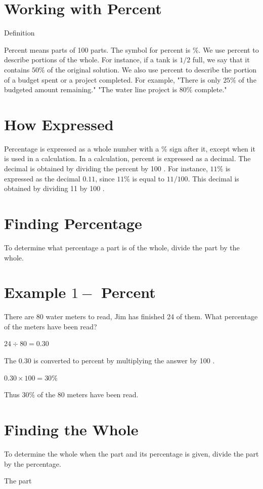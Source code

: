 \documentclass[10pt]{article}
\begin{document}
\section{Working with Percent}
Definition

Percent means parts of 100 parts. The symbol for percent is $\%$. We use percent to describe portions of the whole. For instance, if a tank is $1 / 2$ full, we say that it contains $50 \%$ of the original solution. We also use percent to describe the portion of a budget spent or a project completed. For example, "There is only $25 \%$ of the budgeted amount remaining." "The water line project is $80 \%$ complete."

\section{How Expressed}
Percentage is expressed as a whole number with a \% sign after it, except when it is used in a calculation. In a calculation, percent is expressed as a decimal. The decimal is obtained by dividing the percent by 100 . For instance, $11 \%$ is expressed as the decimal $0.11$, since $11 \%$ is equal to $11 / 100$. This decimal is obtained by dividing 11 by 100 .

\section{Finding Percentage}
To determine what percentage a part is of the whole, divide the part by the whole.

\section{Example $1-$ Percent}
There are 80 water meters to read, Jim has finished 24 of them. What percentage of the meters have been read?

$24 \div 80=0.30$

The $0.30$ is converted to percent by multiplying the answer by 100 .

$0.30 \times 100=30 \%$

Thus $30 \%$ of the 80 meters have been read.

\section{Finding the Whole}
To determine the whole when the part and its percentage is given, divide the part by the percentage.

The part
\end{document}
